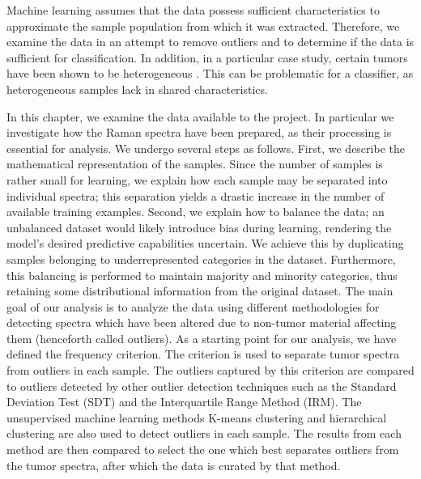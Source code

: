 Machine learning assumes that the data possess sufficient characteristics to approximate the sample population from which it was extracted. Therefore, we examine the data in an attempt to remove outliers and to determine if the data is sufficient for classification. In addition, in a particular case study, certain tumors have been shown to be heterogeneous \cite{friedmann2014glioblastoma}. This can be problematic for a classifier, as heterogeneous samples lack in shared characteristics. 

In this chapter, we examine the data available to the project. In particular we investigate how the Raman spectra have been prepared, as their processing is essential for analysis. We undergo several steps as follows. First, we describe the mathematical representation of the samples. Since the number of samples is rather small for learning, we explain how each sample may be separated into individual spectra; this separation yields a drastic increase in the number of available training examples. Second, we explain how to balance the data; an unbalanced dataset would likely introduce bias during learning, rendering the model's desired predictive capabilities uncertain. We achieve this by duplicating samples belonging to underrepresented categories in the dataset. Furthermore, this balancing is performed to maintain majority and minority categories, thus retaining some distributional information from the original dataset. The main goal of our analysis is to analyze the data using different methodologies for detecting spectra which have been altered due to non-tumor material affecting them (henceforth called outliers). As a starting point for our analysis, we have defined the frequency criterion. The criterion is used to separate tumor spectra from outliers in each sample. The outliers captured by this criterion are compared to outliers detected by other outlier detection techniques such as the Standard Deviation Test (SDT) and the Interquartile Range Method (IRM). The unsupervised machine learning methods K-means clustering and hierarchical clustering are also used to detect outliers in each sample. The results from each method are then compared to select the one which best separates outliers from the tumor spectra, after which the data is curated by that method.

